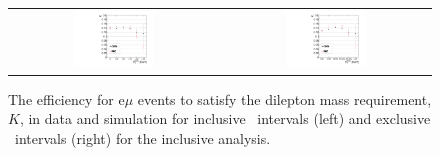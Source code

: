 \begin{figure}[!ht]
\begin{center}
\begin{tabular}{cc}
\includegraphics[width=0.4\textwidth]{plots/extractK_inclusive_19fb.pdf} &
\includegraphics[width=0.4\textwidth]{plots/extractK_exclusive_19fb.pdf} \\
\end{tabular}
\caption{\label{fig:K_incl}
The efficiency for e$\mu$ events to satisfy the dilepton mass requirement, $K$, in data and simulation for inclusive \MET\ intervals (left) and
exclusive \MET\ intervals (right) for the inclusive analysis. 
}

\end{center}
\end{figure}
